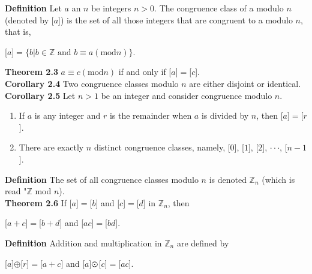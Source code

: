\documentclass[12pt]{article}
\newcommand{\Z}{\mathbb{Z}}
\begin{document}
\noindent
\textbf{Definition} Let $a$ an $n$ be integers $n>0$. The congruence class of a modulo $n$ (denoted by [$a$]) is the set of all those integers that are congruent to a modulo $n$, that is,
\begin{center}
[$a$]$=\{b|b \in \Z \text{  and  } b \equiv a(\text{mod}n)\}$.
\end{center}

\noindent
\textbf{Theorem 2.3} $a \equiv c (\text{mod}n)$ if and only if [$a$]$=$[$c$]. \\

\noindent
\textbf{Corollary 2.4} Two congruence classes modulo $n$ are either disjoint or identical. \\

\noindent
\textbf{Corollary 2.5} Let $n>1$ be an integer and consider congruence modulo $n$.
\begin{enumerate}
\item If $a$ is any integer and $r$ is the remainder when $a$ is divided by $n$, then [$a$]$=$[$r$].
\item There are exactly $n$ distinct congruence classes, namely, [$0$], [$1$], [$2$], $\cdot \cdot \cdot$, [$n-1$].
\end{enumerate}

\noindent
\textbf{Definition} The set of all congruence classes modulo $n$ is denoted $\Z_n$ (which is read "$\Z$ mod $n$). \\

\noindent
\textbf{Theorem 2.6} If [$a$]$=$[$b$] and [$c$]$=$[$d$] in $\Z_n$, then \\
\begin{center}
[$a+c$]$=$[$b+d$] and [$ac$]$=$[$bd$].
\end{center}

\noindent
\textbf{Definition} Addition and multiplication in $\Z_n$ are defined by \\
\begin{center}
[$a$]$\oplus$[$r$]$=$[$a+c$] and [$a$]$\varodot$[$c$]$=$[$ac$].
\end{center}
\end{document}
